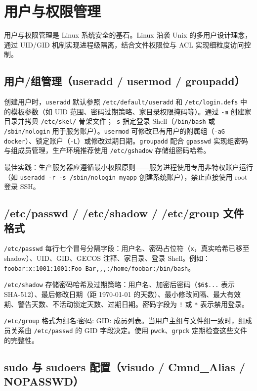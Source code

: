 \documentclass[12pt,UTF8]{ctexbook}
\begin{document}
\section{用户与权限管理}

用户与权限管理是 Linux 系统安全的基石。Linux 沿袭 Unix 的多用户设计理念，通过 UID/GID 机制实现进程级隔离，结合文件权限位与 ACL 实现细粒度访问控制。

\subsection{用户/组管理（useradd / usermod / groupadd）}

创建用户时，\verb|useradd| 默认参照 \verb|/etc/default/useradd| 和 \verb|/etc/login.defs| 中的模板参数（如 UID 范围、密码过期策略、家目录权限掩码等）。通过 \verb|-m| 创建家目录并拷贝 \verb|/etc/skel/| 骨架文件；\verb|-s| 指定登录 Shell（\verb|/bin/bash| 或 \verb|/sbin/nologin| 用于服务账户）。\verb|usermod| 可修改已有用户的附属组（\verb|-aG docker|）、锁定账户（\verb|-L|）或修改过期日期。\verb|groupadd| 配合 \verb|gpasswd| 实现组密码与组成员管理，生产环境推荐使用 \verb|/etc/gshadow| 存储组密码哈希。

最佳实践：生产服务器应遵循最小权限原则——服务进程使用专用非特权账户运行（如 \verb|useradd -r -s /sbin/nologin myapp| 创建系统账户），禁止直接使用 root 登录 SSH。

\subsection{/etc/passwd / /etc/shadow / /etc/group 文件格式}

\verb|/etc/passwd| 每行七个冒号分隔字段：用户名、密码占位符（\verb|x|，真实哈希已移至 shadow）、UID、GID、GECOS 注释、家目录、登录 Shell。例如：\verb|foobar:x:1001:1001:Foo Bar,,,:/home/foobar:/bin/bash|。

\verb|/etc/shadow| 存储密码哈希及过期策略：用户名、加密后密码（\verb|$6$...| 表示 SHA-512）、最后修改日期（距 1970-01-01 的天数）、最小修改间隔、最大有效期、警告天数、不活动锁定天数、过期日期。密码字段为 \verb|!| 或 \verb|*| 表示禁用登录。

\verb|/etc/group| 格式为组名:密码: GID: 成员列表。当用户主组与文件组一致时，组成员关系由 \verb|/etc/passwd| 的 GID 字段决定。使用 \verb|pwck|、\verb|grpck| 定期检查这些文件的完整性。

\subsection{sudo 与 sudoers 配置（visudo / Cmnd\_Alias / NOPASSWD）}
\end{document}
